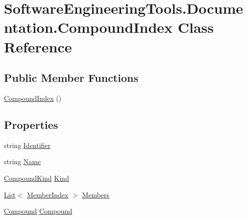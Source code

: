 \hypertarget{class_software_engineering_tools_1_1_documentation_1_1_compound_index}{\section{Software\+Engineering\+Tools.\+Documentation.\+Compound\+Index Class Reference}
\label{class_software_engineering_tools_1_1_documentation_1_1_compound_index}
}
\subsection*{Public Member Functions}
\begin{DoxyCompactItemize}
\item 
\hyperlink{class_software_engineering_tools_1_1_documentation_1_1_compound_index_ae91f253c49b676581d40cbd52f1644e0}{Compound\+Index} ()
\end{DoxyCompactItemize}
\subsection*{Properties}
\begin{DoxyCompactItemize}
\item 
string \hyperlink{class_software_engineering_tools_1_1_documentation_1_1_compound_index_a988308311c455fcb89b4b14545300752}{Identifier}
\item 
string \hyperlink{class_software_engineering_tools_1_1_documentation_1_1_compound_index_af6581fddcc01a475db082ad5ef186d23}{Name}
\item 
\hyperlink{namespace_software_engineering_tools_1_1_documentation_aae490e51e07ef6e5540a2f2c04fccbb1}{Compound\+Kind} \hyperlink{class_software_engineering_tools_1_1_documentation_1_1_compound_index_ab39d7c9817b5bc97122b11bc6ad84ab4}{Kind}
\item 
\hyperlink{namespace_software_engineering_tools_1_1_documentation_ae0bccf4f49a76db084c1c316e5954ec9a4ee29ca12c7d126654bd0e5275de6135}{List}$<$ \hyperlink{class_software_engineering_tools_1_1_documentation_1_1_member_index}{Member\+Index} $>$ \hyperlink{class_software_engineering_tools_1_1_documentation_1_1_compound_index_a7010d81af3c92ae3595c88c89dc0cd49}{Members}
\item 
\hyperlink{class_software_engineering_tools_1_1_documentation_1_1_compound}{Compound} \hyperlink{class_software_engineering_tools_1_1_documentation_1_1_compound_index_a2e6e9b608ac76ec7450c37d64017efa2}{Compound}
\end{DoxyCompactItemize}


